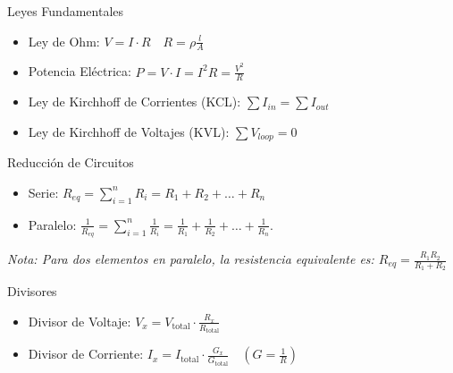 \documentclass[11pt]{article}
\begin{document}
\crearEncabezado

\begin{boxTeoria}{Leyes Fundamentales}

    \begin{itemize}
        \item Ley de Ohm: $V = I \cdot R \quad R = \rho\frac{l}{A}$
        \item Potencia Eléctrica: $\displaystyle P = V \cdot I = I^2 R = \frac{V^2}{R}$
        \item Ley de Kirchhoff de Corrientes (KCL): $\displaystyle\sum I_{in} = \sum I_{out}$
        \item Ley de Kirchhoff de Voltajes (KVL): $\displaystyle\sum V_{loop} = 0$
    \end{itemize}

\end{boxTeoria}

\begin{boxTeoria}{Reducción de Circuitos}

    \begin{itemize}
        \item Serie: $\displaystyle R_{eq} = \sum_{i=1}^{n}R_i = R_1 + R_2 + \ldots + R_n$
        \item Paralelo: $\displaystyle\frac {1}{R_{eq}} = \sum_{i=1}^{n} \frac{1}{R_i} = \frac{1}{R_1} + \frac{1}{R_2} + \ldots + \frac{1}{R_n}$.
    \end{itemize}

    \textit{Nota: Para dos elementos en paralelo, la resistencia equivalente es: $\displaystyle R_{eq} = \frac{R_1 R_2}{R_1 + R_2}$}


\end{boxTeoria}

\begin{boxTeoria}{Divisores}

    \begin{itemize}
        \item Divisor de Voltaje: $\displaystyle V_{x} = V_\mathrm{total} \cdot \frac{R_x}{R_\mathrm{total}}$
        \item Divisor de Corriente: $\displaystyle I_{x} = I_\mathrm{total} \cdot \frac{G_x}{G_\mathrm{total}} \quad \left(G = \frac{1}{R}\right)$
    \end{itemize}

\end{boxTeoria}
\end{document}
